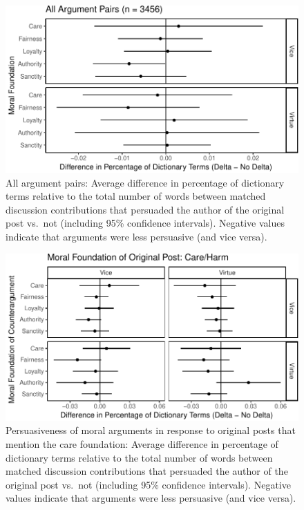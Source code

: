\documentclass[12pt,]{article}
\begin{document}
\begin{figure}
\centering
\includegraphics{prelim_files/figure-latex/check all discussion pairs-1.pdf}
\caption{All argument pairs: Average difference in percentage of
dictionary terms relative to the total number of words between matched
discussion contributions that persuaded the author of the original post
vs.~not (including 95\% confidence intervals). Negative values indicate
that arguments were less persuasive (and vice versa).}
\end{figure}

\begin{figure}
\centering
\includegraphics{prelim_files/figure-latex/op harm-1.pdf}
\caption{Persuasiveness of moral arguments in response to original posts
that mention the care foundation: Average difference in percentage of
dictionary terms relative to the total number of words between matched
discussion contributions that persuaded the author of the original post
vs.~not (including 95\% confidence intervals). Negative values indicate
that arguments were less persuasive (and vice versa).}
\end{figure}
\end{document}
